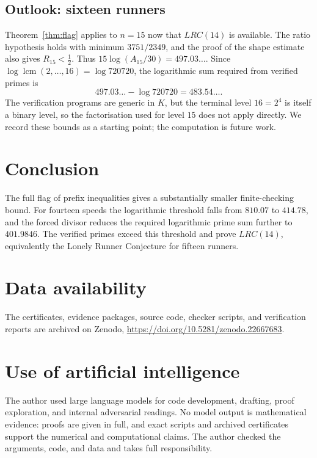 \documentclass[11pt]{article}
\theoremstyle{definition}
\theoremstyle{remark}
\DeclareMathOperator{\lcm}{lcm}
\newcommand{\TargetUB}{401.9846}          %
\begin{document}
\subsection{Outlook: sixteen runners}\label{sec:outlook}

Theorem~\ref{thm:flag} applies to $n=15$ now that $LRC(14)$ is available.
The ratio hypothesis holds with minimum $3751/2349$, and the proof of the
shape estimate also gives $R_{15}<\frac12$.  Thus
$15\log(A_{15}/30)=497.03\ldots$.  Since
$\log\lcm(2,\ldots,16)=\log720720$, the logarithmic sum required from
verified primes is
\[
  497.03\ldots-\log720720=483.54\ldots.
\]
The verification programs are
generic in $K$, but the terminal level $16=2^4$ is itself a binary level,
so the factorisation used for level $15$ does not apply directly.  We
record these bounds as a starting point; the computation is future work.

\section{Conclusion}

The full flag of prefix inequalities gives a substantially smaller
finite-checking bound.  For fourteen speeds the logarithmic threshold
falls from $810.07$ to $414.78$, and the forced divisor reduces the
required logarithmic prime sum further to $\TargetUB$.  The
\GateCount{} verified primes exceed this threshold and prove $LRC(14)$,
equivalently the Lonely Runner Conjecture for fifteen runners.

\section*{Data availability}

The certificates, evidence packages, source code, checker scripts, and
verification reports are archived on Zenodo,
\url{https://doi.org/10.5281/zenodo.22667683}.

\section*{Use of artificial intelligence}

The author used large language models for code development, drafting,
proof exploration, and internal adversarial readings.  No model output is
mathematical evidence:
proofs are given in full, and exact scripts and archived certificates
support the numerical and computational claims.  The author checked the
arguments, code, and data and takes full responsibility.
\end{document}

